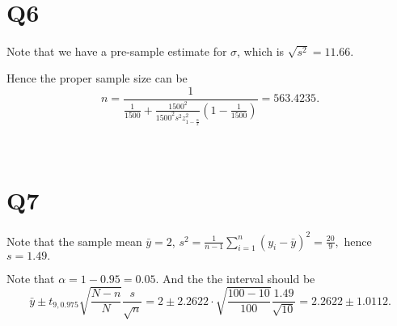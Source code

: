 \documentclass[12pt]{article}%
\begin{document}
~ \ 

\section{Q6}

Note that we have a pre-sample estimate for $\sigma$, which is $\sqrt{s^2}=11.66.$

Hence the proper sample size can be $$n=\frac{1}{\frac{1}{1500}+\frac{1500^2}{1500^2s^2z_{1-\frac{\alpha}{2}}^2}(1-\frac{1}{1500})}=563.4235.$$ 

~\ 

\section{Q7}

Note that the sample mean $\bar{y}=2$, $s^2=\frac{1}{n-1}\sum_{i=1}^{n}(y_i-\bar{y})^2=\frac{20}{9},$ hence $s=1.49.$

Note that $\alpha=1-0.95=0.05.$ And the the interval should be $$\bar{y}\pm t_{9,0.975}\sqrt{\frac{N-n}{N}}\frac{s}{\sqrt{n}}=2\pm 2.2622\cdot \sqrt{\frac{100-10}{100}}\frac{1.49}{\sqrt{10}}=2.2622\pm 1.0112.$$
\end{document}
